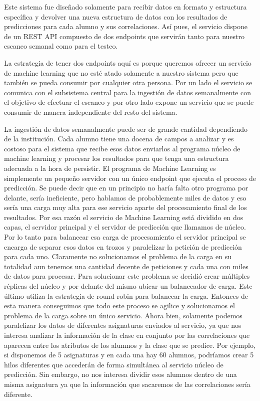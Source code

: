 Este sistema fue diseñado solamente para recibir datos en formato y estructura específica y devolver una nueva estructura de datos con los resultados de predicciones para cada alumno y sus correlaciones. Así pues, el servicio dispone de un REST API compuesto de dos endpoints que servirán tanto para nuestro escaneo semanal como para el testeo.

La estrategia de tener dos endpoints aquí es porque queremos ofrecer un servicio de machine learning que no esté atado solamente a nuestro sistema pero que también se pueda consumir por cualquier otra persona. Por un lado el servicio se comunica con el subsistema central para la ingestión de datos semanalmente con el objetivo de efectuar el escaneo y por otro lado expone un servicio que se puede consumir de manera independiente del resto del sistema.

La ingestión de datos semanalmente puede ser de grande cantidad dependiendo de la institución. Cada alumno tiene una docena de campos a analizar y es costoso para el sistema que recibe esos datos enviarlos al programa núcleo de machine learning y procesar los resultados para que tenga una estructura adecuada a la hora de persistir. El programa de Machine Learning es simplemente un pequeño servidor con un único endpoint que ejecuta el proceso de predicción. Se puede decir que en un principio no haría falta otro programa por delante, sería ineficiente, pero hablamos de probablemente miles de datos y eso sería una carga muy alta para ese servicio aparte del procesamiento final de los resultados. Por esa razón el servicio de Machine Learning está dividido en dos capas, el servidor principal y el servidor de predicción que llamamos de núcleo. Por lo tanto para balancear esa carga de procesamiento el servidor principal se encarga de separar esos datos en trozos y paralelizar la petición de predicción para cada uno. Claramente no solucionamos el problema de la carga en su totalidad aun tenemos una cantidad decente de peticiones y cada una con miles de datos para procesar. Para solucionar este problema se decidió crear múltiples réplicas del núcleo y por delante del mismo ubicar un balanceador de carga. Este último utiliza la estrategia de round robin para balancear la carga. Entonces de esta manera conseguimos que todo este proceso se agilice y solucionamos el problema de la carga sobre un único servicio.
Ahora bien, solamente podemos paralelizar los datos de diferentes asignaturas enviados al servicio, ya que nos interesa analizar la información de la clase en conjunto por las correlaciones que aparecen entre los atributos de los alumnos y la clase que se predice. Por ejemplo, si disponemos de 5 asignaturas y en cada una hay 60 alumnos, podríamos crear 5 hilos diferentes que accederán de forma simultánea al servicio núcleo de predicción. Sin embargo, no nos interesa dividir esos alumnos dentro de una misma asignatura ya que la información que sacaremos de las correlaciones sería diferente.

